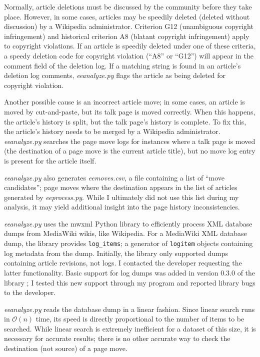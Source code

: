 \documentclass[14pt,a4paper]{report}
\begin{document}
Normally, article deletions must be discussed by the community before they take place. However, in some cases, articles may be speedily deleted (deleted without discussion) by a Wikipedia administrator. Criterion G12 (unambiguous copyright infringement) and historical criterion A8 (blatant copyright infringement) apply to copyright violations. \autocite{csd} If an article is speedily deleted under one of these criteria, a speedy deletion code for copyright violation (``A8'' or ``G12'') will appear in the comment field of the deletion log. If a matching string is found in an article's deletion log comments, \textit{eeanalyze.py} flags the article as being deleted for copyright violation.

Another possible cause is an incorrect article move; in some cases, an article is moved by cut-and-paste, but its talk page is moved correctly. When this happens, the article's history is split, but the talk page's history is complete. To fix this, the article's history needs to be merged by a Wikipedia administrator. \textit{eeanalyze.py} searches the page move logs for instances where a talk page is moved (the destination of a page move is the current article title), but no move log entry is present for the article itself.

\textit{eeanalyze.py} also generates \textit{eemoves.csv}, a file containing a list of ``move candidates''; page moves where the destination appears in the list of articles generated by \textit{eeprocess.py}. While I ultimately did not use this list during my analysis, it may yield additional insight into the page history inconsistencies.

\textit{eeanalyze.py} uses the mwxml Python library to efficiently process XML database dumps from MediaWiki wikis, like Wikipedia. For a MediaWiki XML database dump, the library provides \lstinline[language=python]{log_items}; a generator of \lstinline[language=python]{logitem} objects containing log metadata from the dump. Initially, the library only supported dumps containing article revisions, not logs. I contacted the developer requesting the latter functionality. Basic support for log dumps was added in version 0.3.0 of the library \autocite{mwxml}; I tested this new support through my program and reported library bugs to the developer.

\textit{eeanalyze.py} reads the database dump in a linear fashion. Since linear search runs in $\mathcal{O}(n)$ time, its speed is directly proportional to the number of items to be searched. While linear search is extremely inefficient for a dataset of this size, it is necessary for accurate results; there is no other accurate way to check the destination (not source) of a page move.
\end{document}
